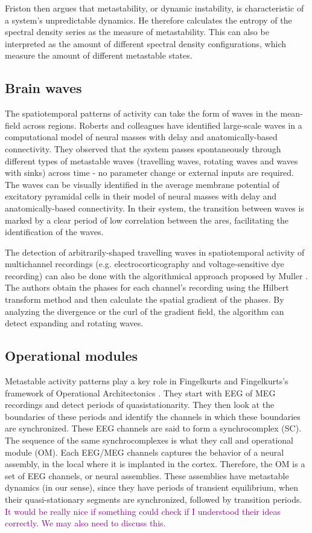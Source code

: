 \documentclass[preprint,superscriptaddress,showpacs,amsmath,amssymb,aps,pre,floatfix]{revtex4-1}
\theoremstyle{definition}
\begin{document}
Friston then argues that metastability, or dynamic instability, is characteristic of a system's unpredictable dynamics. He therefore calculates the entropy of the spectral density series as the measure of metastability. This can also be interpreted as the amount of different spectral density configurations, which measure the amount of different metastable states. 


\subsection{Brain waves}
The spatiotemporal patterns of activity can take the form of waves in the mean-field across regions. Roberts and colleagues have identified large-scale waves in a computational model of neural masses with delay and anatomically-based connectivity\cite{roberts_2019}. They observed that the system passes spontaneously through different types of metastable waves (travelling waves, rotating waves and waves with sinks) across time - no parameter change or external inputs are required. The waves can be visually identified in the average membrane potential of excitatory pyramidal cells in their model of neural masses with delay and anatomically-based connectivity.
In their system, the transition between waves is marked by a clear period of low correlation between the ares, facilitating the identification of the waves.

The detection of arbitrarily-shaped travelling waves in spatiotemporal activity of multichannel recordings (e.g. electrocorticography and voltage-sensitive dye recording) can also be done with the algorithmical approach proposed by Muller \cite{muller_2014, muller_2016}. The authors obtain the phases for each channel's recording using the Hilbert transform method and then calculate the spatial gradient of the phases. By analyzing the divergence or the curl of the gradient field, the algorithm can detect expanding and rotating waves. 

\subsection{Operational modules}
Metastable activity patterns play a key role in Fingelkurts and Fingelkurts's framework of Operational Architectonics \cite{fingelkurts_2008, fingelkurts_2004}. They start with EEG of MEG recordings and detect periods of quasistationarity. They then look at the boundaries of these periods and identify the channels in which these boundaries are synchronized. These EEG channels are said to form a synchrocomplex (SC). The sequence of the same synchrocomplexes is what they call and operational module (OM). Each EEG/MEG channels captures the behavior of a neural assembly, in the local where it is implanted in the cortex. Therefore, the OM is a set of EEG channels, or neural assemblies. These assemblies have metastable dynamics (in our sense), since they have periods of transient equilibrium, when their quasi-stationary segments are synchronized, followed by transition periods. 
\textcolor{purple}{It would be really nice if something could check if I understood their ideas correctly. We may also need to discuss this.}
\end{document}
